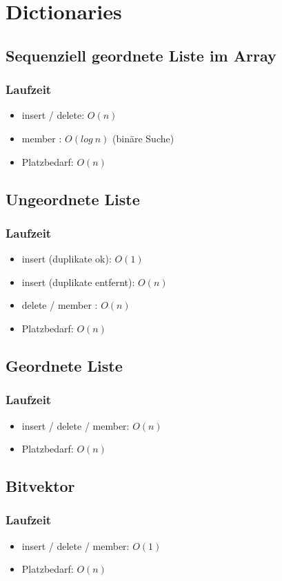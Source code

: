 \section{Dictionaries}

\subsection{Sequenziell geordnete Liste im Array}

\subsubsection{Laufzeit}
\begin{itemize}
    \item insert / delete: $O(n)$
    \item member : $O(log\ n)$ (binäre Suche)
    \item Platzbedarf: $O(n)$
\end{itemize}

\subsection{Ungeordnete Liste}

\subsubsection{Laufzeit}
\begin{itemize}
    \item insert (duplikate ok): $O(1)$
    \item insert (duplikate entfernt): $O(n)$
    \item delete / member : $O(n)$
    \item Platzbedarf: $O(n)$
\end{itemize}

\subsection{Geordnete Liste}

\subsubsection{Laufzeit}
\begin{itemize}
    \item insert / delete / member: $O(n)$
    \item Platzbedarf: $O(n)$
\end{itemize}

\subsection{Bitvektor}

\subsubsection{Laufzeit}
\begin{itemize}
    \item insert / delete / member: $O(1)$
    \item Platzbedarf: $O(n)$
\end{itemize}